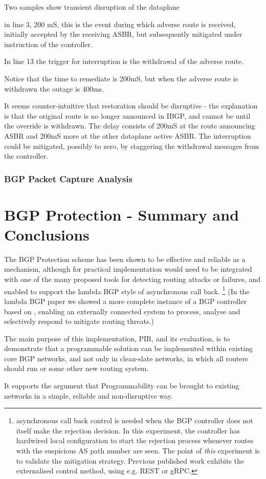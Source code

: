 Two samples show transient disruption of the dataplane

in line 3, 200 mS, this is the event during which adverse route is received, initially accepted by the receiving ASBR, but subsequently mitigated under instruction of the controller.

In line 13 the trigger for interruption is the withdrawal of the adverse route.

Notice that the time to remediate is 200mS, but when the adverse route is withdrawn the outage is 400ms.

It seems counter-intuitive that restoration should be disruptive - the explanation is that the original route is no longer announced in IBGP, and cannot be until the override is withdrawn.
The delay consists of 200mS at the route announcing ASBR and 200mS more at the other dataplane active ASBR.
The interruption could be mitigated, possibly to zero, by staggering the withdrawal messages from the controller.


\subsubsection{BGP Packet Capture Analysis}

\section{BGP Protection - Summary and Conclusions}

The BGP Protection scheme has been shown to be effective and reliable as a mechanism, although for practical implementation would need to be integrated with one of the many proposed tools for detecting routing attacks or failures, and enabled to support the lambda BGP style of asynchronous call back. \footnote{asynchronous call back control is needed when the BGP controller does not itself make the rejection decision.  In this experiment, the \hbgp controller has hardwired local configuration to start the rejection process whenever routes with the suspicious AS path number are seen.  The point of \textit{this} experiment is to validate the mitigation strategy.  Previous published work exhibits the externalised control method, using e.g. REST or gRPC.} (In the lambda BGP paper\cite{lambdabgp} we showed a more complete instance of a BGP controller based on \hbgp, enabling an externally connected system to process, analyse and selectively respond to mitigate routing threats.)

The main purpose of this implementation, PIR,  and its evaluation, is to demonstrate that a programmable solution can be implemented within existing core BGP networks, and not only in clean-slate networks, in which all routers should run \hbgp or some other new routing system.

It supports the argument that Programmability can be brought to existing networks in a simple, reliable and non-disruptive way.